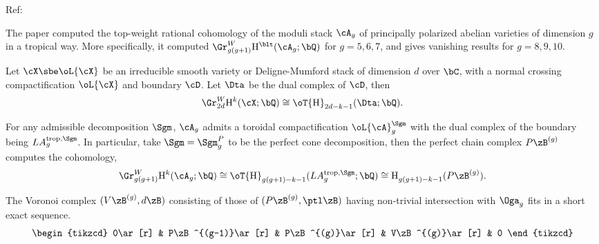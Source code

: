\documentclass[article, a4paper, twoside]{universal}
\begin{document}
\confighead{}{}{}



Ref:~\cite{BBCMMW2020}

The paper computed the top-weight rational cohomology of the moduli stack $\cA_{g}$ of principally polarized abelian varieties of dimension $g$ in a tropical way. More specifically, it computed $\Gr_{g(g+1)}^{W}\mathrm{H}_{}^{\blt}(\cA_{g};\bQ)$ for $g=5,6,7$, and gives vanishing results for $g=8,9,10$.

\begin{thm}
	Let $\cX\sbe\oL{\cX}$ be an irreducible smooth variety or Deligne-Mumford stack of dimension $d$ over $\bC$, with a normal crossing compactification $\oL{\cX}$ and boundary $\cD$. Let $\Dta$ be the dual complex of $\cD$, then
	\[
		\Gr_{2d}^{W}\mathrm{H}_{}^{k}(\cX;\bQ)\cong \oT{\mathrm{H}}_{2d-k-1}^{}(\Dta;\bQ).
	\]
\end{thm}

\begin{thm}
	For any admissible decomposition $\Sgm$, $\cA_{g}$ admits a toroidal compactification $\oL{\cA}_{g}^{\Sgm}$ with the dual complex of the boundary being $LA_{g}^{\text{trop},\Sgm}$. In particular, take $\Sgm=\Sgm_{g}^{P}$ to be the perfect cone decomposition, then the perfect chain complex $P\zB^{(g)}$ computes the cohomology,
	\[
		\Gr_{g(g+1)}^{W}\mathrm{H}_{}^{k}(\cA_{g};\bQ)\cong \oT{\mathrm{H}}_{g(g+1)-k-1}^{}(LA_{g}^{\text{trop},\Sgm};\bQ)\cong \mathrm{H}_{g(g+1)-k-1}^{}(P\zB^{(g)}).
	\]
\end{thm}

\begin{thm}
	The Voronoi complex $(V\zB^{(g)},d\zB)$ consisting of those of $(P\zB^{(g)},\ptl\zB)$ having non-trivial intersection with $\Oga_{g}$ fits in a short exact sequence.
	\[
		\begin{tikzcd}
			0\ar[r] & P\zB^{(g-1)}\ar[r] & P\zB^{(g)}\ar[r] & V\zB^{(g)}\ar[r] & 0
		\end{tikzcd}
	\]
\end{thm}

\end{document}
